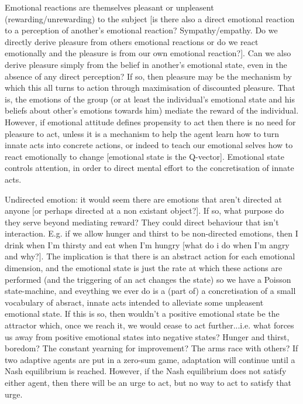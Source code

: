 \documentclass[a4paper]{article}
\begin{document}
Emotional reactions are themselves pleasant or unpleasent (rewarding/unrewarding) to the subject [is there also a direct emotional reaction to a perception of another's emotional reaction? Sympathy/empathy. Do we directly derive pleasure from others emotional reactions or do we react emotionally and the pleasure is from our own emotional reaction?]. Can we also derive pleasure simply from the belief in another's emotional state, even in the absence of any direct perception? If so, then pleasure may be the mechanism by which this all turns to action through maximisation of discounted pleasure. That is, the emotions of the group (or at least the individual's emotional state and his beliefs about other's emotions towards him) mediate the reward of the individual. However, if emotional attitude defines propensity to act then there is no need for pleasure to act, unless it is a mechanism to help the agent learn how to turn innate acts into concrete actions, or indeed to teach our emotional selves how to react emotionally to change [emotional state is the Q-vector]. Emotional state controls attention, in order to direct mental effort to the concretisation of innate acts.

Undirected emotion: it would seem there are emotions that aren't directed at anyone [or perhaps directed at a non existant object?]. If so, what purpose do they serve beyond mediating reward? They could direct behaviour that isn't interaction. E.g. if we allow hunger and thirst to be non-directed emotions, then I drink when I'm thirsty and eat when I'm hungry [what do i do when I'm angry and why?]. The implication is that there is an abstract action for each emotional dimension, and the emotional state is just the rate at which these actions are performed (and the triggering of an act changes the state) so we have a Poisson state-machine, and eveything we ever do is a (part of) a concretisation of a small vocabulary of absract, innate acts intended to alleviate some unpleasent emotional state. If this is so, then wouldn't a positive emotional state be the attractor which, once we reach it, we would cease to act further...i.e. what forces us away from positive emotional states into negative states? Hunger and thirst, boredom? The constant yearning for improvement? The arms race with others? If two adaptive agents are put in a zero-sum game, adaptation will continue until a Nash equilibrium is reached. However, if the Nash equilibrium does not satisfy either agent, then there will be an urge to act, but no way to act to satisfy that urge.
\end{document}
